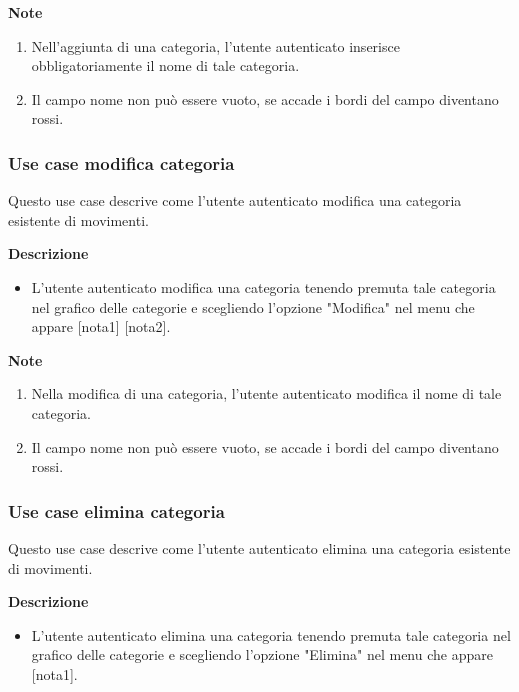 \documentclass[a4paper,12pt]{article}
\begin{document}
\textbf{Note}
\begin{enumerate} \setlength\itemsep{0.01em}
\item Nell'aggiunta di una categoria, l'utente autenticato inserisce obbligatoriamente il nome di tale categoria.
\item Il campo nome non può essere vuoto, se accade i bordi del campo diventano rossi.
\end{enumerate}




\subsubsection*{Use case modifica categoria}

Questo use case descrive come l'utente autenticato modifica una categoria esistente di movimenti.

\textbf{Descrizione}
\begin{itemize} \setlength\itemsep{0.01em}
\item L'utente autenticato modifica una categoria tenendo premuta tale categoria nel grafico delle categorie e scegliendo l'opzione "Modifica" nel menu che appare [nota1] [nota2].
\end{itemize}

\textbf{Note}
\begin{enumerate} \setlength\itemsep{0.01em}
\item Nella modifica di una categoria, l'utente autenticato modifica il nome di tale categoria.
\item Il campo nome non può essere vuoto, se accade i bordi del campo diventano rossi.
\end{enumerate}



\subsubsection*{Use case elimina categoria}

Questo use case descrive come l'utente autenticato elimina una categoria esistente di movimenti.

\textbf{Descrizione}
\begin{itemize} \setlength\itemsep{0.01em}
\item L'utente autenticato elimina una categoria tenendo premuta tale categoria nel grafico delle categorie e scegliendo l'opzione "Elimina" nel menu che appare [nota1].
\end{itemize}
\end{document}
